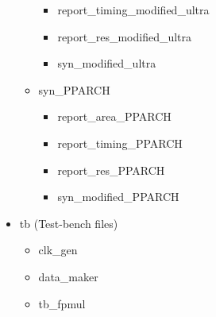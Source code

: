 \begin{itemize}
\begin{itemize}
\begin{itemize}
            \item report\_timing\_modified\_ultra
            \item report\_res\_modified\_ultra
            \item syn\_modified\_ultra
        \end{itemize}
        \item syn\_PPARCH
         \begin{itemize}
            \item report\_area\_PPARCH
            \item report\_timing\_PPARCH
            \item report\_res\_PPARCH
            \item syn\_modified\_PPARCH
        \end{itemize}
    \end{itemize}
    \item tb (Test-bench files)
         \begin{itemize}
            \item clk\_gen
            \item data\_maker
            \item tb\_fpmul
        \end{itemize}    
\end{itemize}
